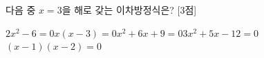 다음 중 $x=3$을 해로 갖는 이차방정식은? \mbox{[3점]}
\begin{choicesii}{$2x^2-6=0$}{$x(x-3)=0$}{$x^2+6x+9=0$}{$3x^2+5x-12=0$}{$(x-1)(x-2)=0$}\end{choicesii}
